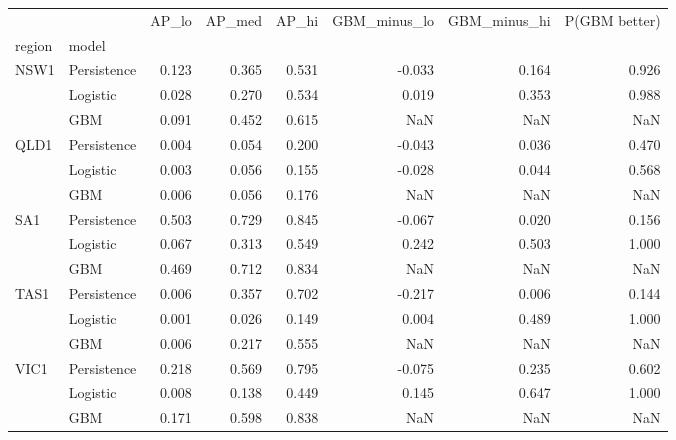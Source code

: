 \begin{tabular}{llrrrrrr}
\toprule
 & & AP\_lo & AP\_med & AP\_hi & GBM\_minus\_lo & GBM\_minus\_hi & P(GBM better) \\
region & model & & & & & & \\
\midrule
\multirow[t]{3}{*}{NSW1} & Persistence & 0.123 & 0.365 & 0.531 & -0.033 & 0.164 & 0.926 \\
 & Logistic & 0.028 & 0.270 & 0.534 & 0.019 & 0.353 & 0.988 \\
 & GBM & 0.091 & 0.452 & 0.615 & NaN & NaN & NaN \\
\cline{1-8}
\multirow[t]{3}{*}{QLD1} & Persistence & 0.004 & 0.054 & 0.200 & -0.043 & 0.036 & 0.470 \\
 & Logistic & 0.003 & 0.056 & 0.155 & -0.028 & 0.044 & 0.568 \\
 & GBM & 0.006 & 0.056 & 0.176 & NaN & NaN & NaN \\
\cline{1-8}
\multirow[t]{3}{*}{SA1} & Persistence & 0.503 & 0.729 & 0.845 & -0.067 & 0.020 & 0.156 \\
 & Logistic & 0.067 & 0.313 & 0.549 & 0.242 & 0.503 & 1.000 \\
 & GBM & 0.469 & 0.712 & 0.834 & NaN & NaN & NaN \\
\cline{1-8}
\multirow[t]{3}{*}{TAS1} & Persistence & 0.006 & 0.357 & 0.702 & -0.217 & 0.006 & 0.144 \\
 & Logistic & 0.001 & 0.026 & 0.149 & 0.004 & 0.489 & 1.000 \\
 & GBM & 0.006 & 0.217 & 0.555 & NaN & NaN & NaN \\
\cline{1-8}
\multirow[t]{3}{*}{VIC1} & Persistence & 0.218 & 0.569 & 0.795 & -0.075 & 0.235 & 0.602 \\
 & Logistic & 0.008 & 0.138 & 0.449 & 0.145 & 0.647 & 1.000 \\
 & GBM & 0.171 & 0.598 & 0.838 & NaN & NaN & NaN \\
\cline{1-8}
\bottomrule
\end{tabular}